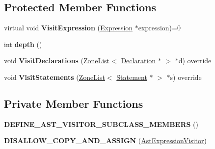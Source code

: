\subsection*{Protected Member Functions}
\begin{DoxyCompactItemize}
\item 
virtual void {\bfseries Visit\+Expression} (\hyperlink{classv8_1_1internal_1_1_expression}{Expression} $\ast$expression)=0\hypertarget{classv8_1_1internal_1_1_ast_expression_visitor_ad71791090dd0446e9646102213613566}{}\label{classv8_1_1internal_1_1_ast_expression_visitor_ad71791090dd0446e9646102213613566}

\item 
int {\bfseries depth} ()\hypertarget{classv8_1_1internal_1_1_ast_expression_visitor_a2d26bfcafb51a82ac8475b59f371d1ed}{}\label{classv8_1_1internal_1_1_ast_expression_visitor_a2d26bfcafb51a82ac8475b59f371d1ed}

\item 
void {\bfseries Visit\+Declarations} (\hyperlink{classv8_1_1internal_1_1_zone_list}{Zone\+List}$<$ \hyperlink{classv8_1_1internal_1_1_declaration}{Declaration} $\ast$ $>$ $\ast$d) override\hypertarget{classv8_1_1internal_1_1_ast_expression_visitor_ac22237d23356e730ee935638d0df86c2}{}\label{classv8_1_1internal_1_1_ast_expression_visitor_ac22237d23356e730ee935638d0df86c2}

\item 
void {\bfseries Visit\+Statements} (\hyperlink{classv8_1_1internal_1_1_zone_list}{Zone\+List}$<$ \hyperlink{classv8_1_1internal_1_1_statement}{Statement} $\ast$ $>$ $\ast$s) override\hypertarget{classv8_1_1internal_1_1_ast_expression_visitor_a19e47fa64828b128ef71e08b65bed2c9}{}\label{classv8_1_1internal_1_1_ast_expression_visitor_a19e47fa64828b128ef71e08b65bed2c9}

\end{DoxyCompactItemize}
\subsection*{Private Member Functions}
\begin{DoxyCompactItemize}
\item 
{\bfseries D\+E\+F\+I\+N\+E\+\_\+\+A\+S\+T\+\_\+\+V\+I\+S\+I\+T\+O\+R\+\_\+\+S\+U\+B\+C\+L\+A\+S\+S\+\_\+\+M\+E\+M\+B\+E\+RS} ()\hypertarget{classv8_1_1internal_1_1_ast_expression_visitor_a6727ffd006b60c417d302fcaca29f85a}{}\label{classv8_1_1internal_1_1_ast_expression_visitor_a6727ffd006b60c417d302fcaca29f85a}

\item 
{\bfseries D\+I\+S\+A\+L\+L\+O\+W\+\_\+\+C\+O\+P\+Y\+\_\+\+A\+N\+D\+\_\+\+A\+S\+S\+I\+GN} (\hyperlink{classv8_1_1internal_1_1_ast_expression_visitor}{Ast\+Expression\+Visitor})\hypertarget{classv8_1_1internal_1_1_ast_expression_visitor_a8931059dead7c5609b0bbcd1765648c0}{}\label{classv8_1_1internal_1_1_ast_expression_visitor_a8931059dead7c5609b0bbcd1765648c0}

\end{DoxyCompactItemize}
